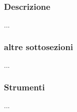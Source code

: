     \subsubsection{Descrizione}
    ...
    \subsubsection{altre sottosezioni}
    ...
    \subsubsection{Strumenti}
    ...

\begin{comment}
\subsection{Comunicazione}
\subsubsection{Scopo}
Lo scopo del processo di ...

\subsection{Riunioni}
\subsubsection{Scopo}
Lo scopo del processo di ...

\subsection{Ruoli di Progetto}
\subsubsection{Scopo}
Lo scopo del processo di ...

\subsection{Ambiente di Lavoro}
\subsubsection{Scopo}
Lo scopo del processo di ...
\end{comment}